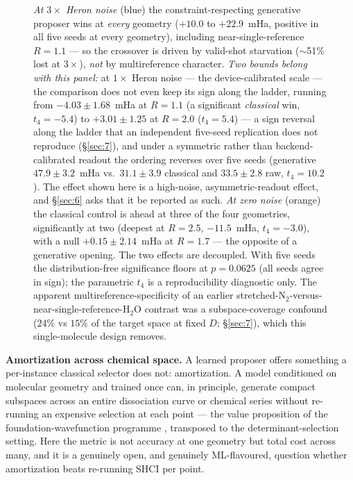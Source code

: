 \documentclass[onecolumn,a4paper]{quantumarticle}
\begin{document}
\begin{figure}[tbp]
{\emph{At $3\times$ Heron noise} (blue) the constraint-respecting generative proposer wins at \emph{every} geometry
($+10.0$ to $+22.9$~mHa, positive in all five seeds at every geometry), including near-single-reference $R{=}1.1$
--- so the crossover is driven by valid-shot starvation ($\sim$51\% lost at $3\times$), \emph{not} by multireference
character. \emph{Two bounds belong with this panel:} at $1\times$ Heron noise --- the device-calibrated scale ---
the comparison does not even keep its sign along the ladder, running from $-4.03\pm1.68$~mHa at $R{=}1.1$ (a significant
\emph{classical} win, $t_4{=}-5.4$) to $+3.01\pm1.25$ at $R{=}2.0$ ($t_4{=}5.4$) --- a sign reversal along the
ladder that an independent five-seed replication does not reproduce (\S\ref{sec:7}), and under a symmetric rather
than backend-calibrated readout the ordering reverses over five seeds (generative $47.9\pm3.2$~mHa vs.\ $31.1\pm3.9$
classical and $33.5\pm2.8$ raw, $t_4{=}10.2$). The effect shown here is a high-noise, asymmetric-readout effect,
and \S\ref{sec:6} asks that it be reported as such. \emph{At zero noise} (orange) the classical control is ahead
at three of the four geometries, significantly at two (deepest at $R{=}2.5$, $-11.5$~mHa, $t_4{=}-3.0$), with a
null $+0.15\pm2.14$~mHa at $R{=}1.7$ --- the opposite of a generative opening. The two effects are decoupled. With
five seeds the distribution-free significance floors at $p{=}0.0625$ (all seeds agree in sign); the parametric
$t_4$ is a reproducibility diagnostic only. The apparent multireference-specificity of an earlier stretched-N$_2$-versus-near-single-reference-H$_2$O
contrast was a subspace-coverage confound ($24\%$ vs $15\%$ of the target space at fixed $D$; \S\ref{sec:7}), which
this single-molecule design removes.}
\label{fig:crossover}
\end{figure}

\textbf{Amortization across chemical space.} A learned proposer offers something a per-instance classical selector does not: amortization. A model conditioned on molecular geometry and trained once can, in principle, generate compact subspaces across an entire dissociation curve or chemical series without re-running an expensive selection at each point --- the value proposition of the foundation-wavefunction programme \cite{foster2025}, transposed to the determinant-selection setting. Here the metric is not accuracy at one geometry but total cost across many, and it is a genuinely open, and genuinely ML-flavoured, question whether amortization beats re-running SHCI per point.
\end{document}
